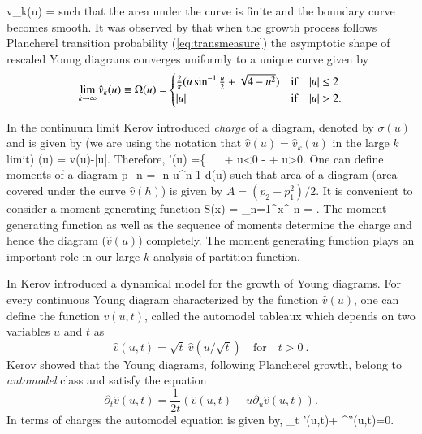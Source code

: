 \documentclass[final,3p,12pt,times]{elsarticle}
\numberwithin{equation}{section}
\begin{document}
%
\be\label{eq:vk}
\hat v_k(u) = 
\ee
%
such that the area under the curve is finite and the boundary curve becomes smooth. It was observed by \cite{LogShe,VerKer77} that when the growth process follows Plancherel transition probability (\ref{eq:transmeasure}) the asymptotic shape of rescaled Young diagrams converges uniformly to a unique curve given by
\begin{equation}
\label{eq:kerovfunction}
\lim_{k \ra \infty}\hat v_k(u)\equiv\Omega(u)=
\begin{cases}
\frac{2}{\pi}(u \sin^{-1} \frac{u}{2}+\sqrt{4-u^2}) &\mbox{if} \quad |u| \leq 2\\
|u|& \mbox{if} \quad |u|>2.
\end{cases}
\end{equation}

In the continuum limit Kerov introduced \cite{Kerov1} \emph{charge} of a diagram, denoted by $\sigma(u)$ and is given by (we are using the notation that $\hat v(u) =\hat v_k(u)$ in the large $k$ limit)
%
\ben\label{eq:youngcharge}
\sigma(u) =  \lb\hat v(u)-|u|\rb.
\een
%
Therefore,
%
\ben\label{eq:chargeprime}
\sigma'(u) =\bigg\{ {\ \  + \quad \for \quad u<0 \atop - + \quad \for \quad u>0}.
\een
%
One can define moments of a diagram
%
\ben\label{eq:moments}
p_n = -n \int u^{n-1} d\sigma(u)
\een
%
such that area of a diagram (area covered under the curve $\hat v(h)$) is given by $A=(p_2-p_1^2)/2$. It is convenient to consider a moment generating function
%
\ben\label{eq:momgenfunc}
S(x) = \sum_{n=1}^{\infty}x^{-n} = \int {}.
\een
%
The moment generating function as well as the sequence of moments determine the charge and hence the diagram ($\hat v(u)$) completely. The moment generating function plays an important role in our large $k$ analysis of partition function.

In \cite{Kerov1} Kerov introduced a dynamical model for the growth of Young diagrams. For every continuous Young diagram characterized by the function $\hat v(u)$, one can define the function $v(u,t)$, called the automodel tableaux which depends on two variables $u$ and $t$ as
\begin{equation}
\hat v(u,t)=\sqrt{t} \ \hat v(u/\sqrt{t}) \quad \mbox{for} \quad t>0\ .
\end{equation}
Kerov showed that the Young diagrams, following Plancherel growth, belong to \emph{automodel} class and satisfy the equation
\begin{equation}\label{eq:automodeleqnv}
{\partial_t \hat v(u,t)}=\frac{1}{2t}(\hat v(u,t)-u\partial_u \hat v(u,t)).
\end{equation}
In terms of charges the automodel equation is given by,
%
\ben\label{eq:automodeleqnsigma}
\dow_t \sigma'(u,t)+ \sigma^{''}(u,t)=0.
\een
%
\end{document}

